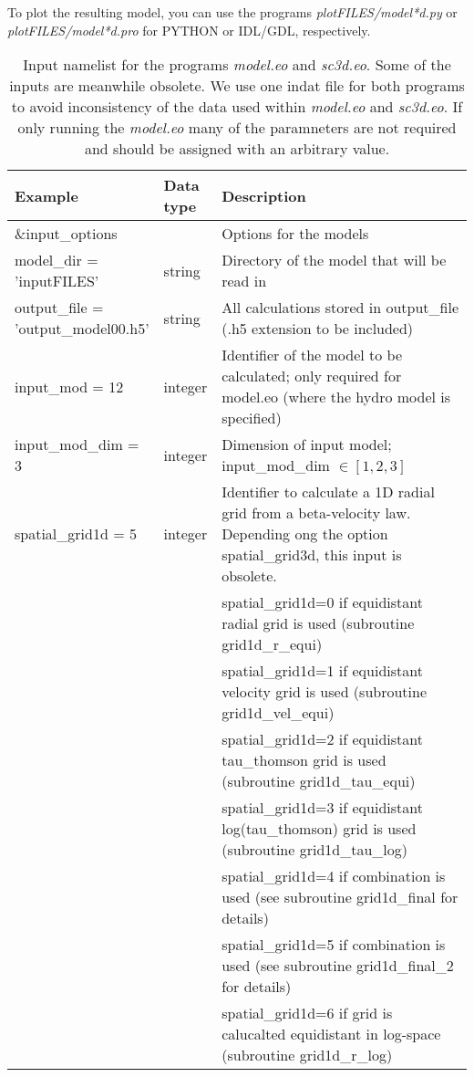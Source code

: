 \documentclass[10pt,a4paper]{article}
\begin{document}
%
To plot the resulting model, you can use the programs
\textit{plotFILES/model*d.py} or \textit{plotFILES/model*d.pro} for
PYTHON or IDL/GDL, respectively.
%
\begin{footnotesize}
\begin{longtable}[h]{p{0.24\linewidth}p{0.07\linewidth}p{0.69\linewidth}}
\caption{\normalsize Input namelist for the programs \textit{model.eo} and
  \textit{sc3d.eo}. Some of the inputs are meanwhile obsolete. We use one indat file for both programs to avoid inconsistency of the data used within \textit{model.eo} and \textit{sc3d.eo}. If only running the \textit{model.eo} many of the paramneters are not required and should be assigned with an arbitrary value.}
\label{tab:namelist_sc3d}
\\\hline\hline
 Example & Data type & Description \\\hline
  \&input\_options & & Options for the models \\
model\_dir = 'inputFILES' & string & Directory of the model that will be read in \\
output\_file = 'output\_model00.h5' & string & All calculations stored in output\_file (.h5 extension to be included) \\
input\_mod = 12 & integer & Identifier of the model to be calculated; only required for model.eo (where the hydro model is specified)\\
input\_mod\_dim = 3 & integer & Dimension of input model; input\_mod\_dim $\in [1,2,3]$ \\
%
spatial\_grid1d = 5 & integer & Identifier to calculate a 1D radial grid from a beta-velocity law. Depending ong the option spatial\_grid3d, this input is obsolete.\\
 & & spatial\_grid1d=0 if equidistant radial grid is used (subroutine grid1d\_r\_equi) \\
 & & spatial\_grid1d=1 if equidistant velocity grid is used (subroutine grid1d\_vel\_equi) \\
 & & spatial\_grid1d=2 if equidistant tau\_thomson grid is used (subroutine grid1d\_tau\_equi) \\
 & & spatial\_grid1d=3 if equidistant log(tau\_thomson) grid is used (subroutine grid1d\_tau\_log) \\
 & & spatial\_grid1d=4 if combination is used (see subroutine grid1d\_final for details) \\
 & & spatial\_grid1d=5 if combination is used (see subroutine grid1d\_final\_2 for details) \\
 & & spatial\_grid1d=6 if grid is calucalted equidistant in log-space (subroutine grid1d\_r\_log) \\

\end{longtable}
\end{footnotesize}
\end{document}
